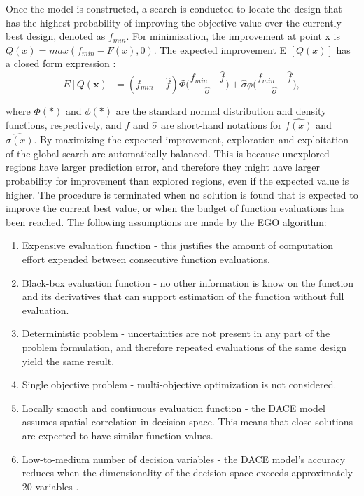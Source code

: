 \documentclass[10pt]{llncs}
\begin{document}
Once the model is constructed, a search is conducted to locate the design that has the highest probability of improving the objective value over the currently best design, denoted as $f_{min}$. For minimization, the improvement at point x is $Q(x)=max(f_{min} - F(x),0)$. The expected improvement E $[Q(x)]$ has a closed form expression \cite{Jones1998Efficient}: 
\begin{equation}\label{eq1}
	E[Q(\textbf{x})]=(f_{min}-\hat{f})\Phi\bigg(\frac{f_{min}-\hat{f}}{\hat{\sigma}}\bigg)+\hat{\sigma}\phi\bigg(\frac{f_{min}-\hat{f}}{\hat{\sigma}}\bigg),
\end{equation} 

where $\Phi{(*)}$ and $\phi{(*)}$ are the standard normal distribution and density functions,
respectively, and $\hat{f}$ and $\hat{\sigma}$ are short-hand notations for $\hat{f(x)}$ and $\hat{\sigma(x)}$.
By maximizing the expected improvement, exploration and exploitation of
the global search are automatically balanced. This is because unexplored regions
have larger prediction error, and therefore they might have larger probability for
improvement than explored regions, even if the expected value is higher. The
procedure is terminated when no solution is found that is expected to improve
the current best value, or when the budget of function evaluations has been
reached.
The following assumptions are made by the EGO algorithm:
\begin{enumerate}
	\item Expensive evaluation function - this justifies the amount of computation effort 			          expended between consecutive function evaluations.
	\item Black-box evaluation function - no other information is know on the function and its  	          derivatives that can support estimation of the function without full evaluation.
	\item Deterministic problem - uncertainties are not present in any part of the problem     	     	      formulation, and therefore repeated evaluations of the same design yield the same   		          result.
	\item Single objective problem - multi-objective optimization is not considered.
	\item Locally smooth and continuous evaluation function - the DACE model assumes spatial 			      correlation in decision-space. This means that close solutions are expected to have 			      similar function values.
	\item Low-to-medium number of decision variables - the DACE model's accuracy reduces when 	  		  the dimensionality of the decision-space exceeds approximately 20 variables \cite{Knowles2006ParEGO}.	
\end{enumerate}
\end{document}
